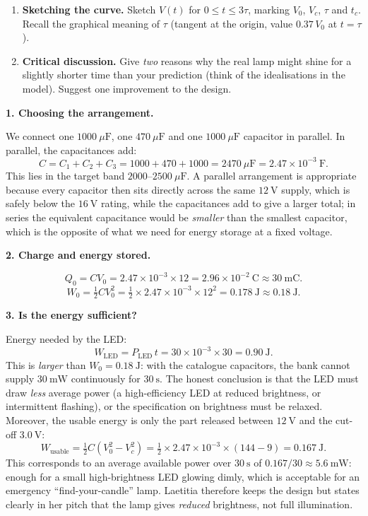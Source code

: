 \documentclass[11pt]{article}
\newcounter{popsec}
\newcounter{popsub}
\newcommand{\courssub}[1]{%
  \stepcounter{popsub}%
  \par\vspace{9pt}\noindent{\popxbold\fontsize{11.5}{13}\selectfont\color{popink}{\color{poporange}\thepopsec.\thepopsub}\hspace{6pt}#1}\par\nopagebreak\vspace{4pt}
}
\begin{document}
\begin{enumerate}
\item \textbf{Sketching the curve.} Sketch $V(t)$ for $0 \leq t \leq 3\tau$, marking $V_{0}$, $V_{c}$, $\tau$ and $t_{c}$. Recall the graphical meaning of $\tau$ (tangent at the origin, value $0.37\,V_{0}$ at $t = \tau$).
\item \textbf{Critical discussion.} Give \emph{two} reasons why the real lamp might shine for a slightly shorter time than your prediction (think of the idealisations in the model). Suggest one improvement to the design.
\end{enumerate}

\courssub{Model answer}

\textbf{1. Choosing the arrangement.}\par
We connect one $1000\ \mu\mathrm{F}$, one $470\ \mu\mathrm{F}$ and one $1000\ \mu\mathrm{F}$ capacitor in parallel. In parallel, the capacitances add:
\[
C = C_{1} + C_{2} + C_{3} = 1000 + 470 + 1000 = 2470\ \mu\mathrm{F} = 2.47\times 10^{-3}\ \mathrm{F}.
\]
This lies in the target band $2000$--$2500\ \mu\mathrm{F}$. A parallel arrangement is appropriate because every capacitor then sits directly across the same $12\ \mathrm{V}$ supply, which is safely below the $16\ \mathrm{V}$ rating, while the capacitances add to give a larger total; in series the equivalent capacitance would be \emph{smaller} than the smallest capacitor, which is the opposite of what we need for energy storage at a fixed voltage.

\textbf{2. Charge and energy stored.}\par
\[
Q_{0} = CV_{0} = 2.47\times 10^{-3} \times 12 = 2.96\times 10^{-2}\ \mathrm{C} \approx 30\ \mathrm{mC}.
\]
\[
W_{0} = \tfrac{1}{2}CV_{0}^{2} = \tfrac{1}{2}\times 2.47\times 10^{-3}\times 12^{2} = 0.178\ \mathrm{J} \approx 0.18\ \mathrm{J}.
\]

\textbf{3. Is the energy sufficient?}\par
Energy needed by the LED:
\[
W_{\text{LED}} = P_{\text{LED}}\,t = 30\times 10^{-3} \times 30 = 0.90\ \mathrm{J}.
\]
This is \emph{larger} than $W_{0} = 0.18\ \mathrm{J}$: with the catalogue capacitors, the bank cannot supply $30\ \mathrm{mW}$ continuously for $30\ \mathrm{s}$. The honest conclusion is that the LED must draw \emph{less} average power (a high-efficiency LED at reduced brightness, or intermittent flashing), or the specification on brightness must be relaxed. Moreover, the usable energy is only the part released between $12\ \mathrm{V}$ and the cut-off $3.0\ \mathrm{V}$:
\[
W_{\text{usable}} = \tfrac{1}{2}C\left(V_{0}^{2} - V_{c}^{2}\right) = \tfrac{1}{2}\times 2.47\times 10^{-3}\times(144 - 9) = 0.167\ \mathrm{J}.
\]
This corresponds to an average available power over $30\ \mathrm{s}$ of $0.167/30 \approx 5.6\ \mathrm{mW}$: enough for a small high-brightness LED glowing dimly, which is acceptable for an emergency ``find-your-candle'' lamp. Laetitia therefore keeps the design but states clearly in her pitch that the lamp gives \emph{reduced} brightness, not full illumination.
\end{document}
